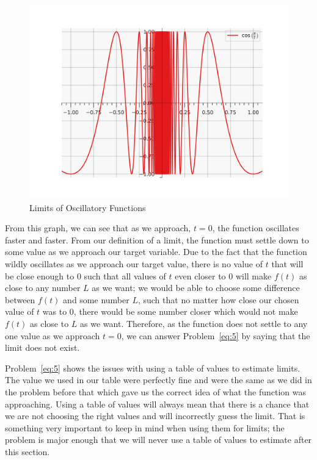\documentclass[12pt]{article}
\theoremstyle{definition}
\begin{document}
\begin{figure}[H]
    \centering
    \includegraphics[width=12.5cm, keepaspectratio]{limits_3.png}
    \caption{Limits of Oscillatory Functions}
    \label{fig:fig3}
\end{figure}

From this graph, we can see that as we approach, $t=0$, the function oscillates faster and faster.
From our definition of a limit, the function must settle down to some value as we approach our target variable.
Due to the fact that the function wildly oscillates as we approach our target value, there is no value of $t$ that will be close enough to 0 such that all values of $t$ even closer to 0 will make $f(t)$ as close to any number $L$ as we want; we would be able to choose some difference between $f(t)$ and some number $L$, such that no matter how close our chosen value of $t$ was to 0, there would be some number closer which would not make $f(t)$ as close to $L$ as we want.
Therefore, as the function does not settle to any one value as we approach $t=0$, we can answer Problem~\eqref{eq:5} by saying that the limit does not exist.

Problem~\eqref{eq:5} shows the issues with using a table of values to estimate limits.
The value we used in our table were perfectly fine and were the same as we did in the problem before that which gave us the correct idea of what the function was approaching.
Using a table of values will always mean that there is a chance that we are not choosing the right values and will incorrectly guess the limit.
That is something very important to keep in mind when using them for limits; the problem is major enough that we will never use a table of values to estimate after this section.
\end{document}
